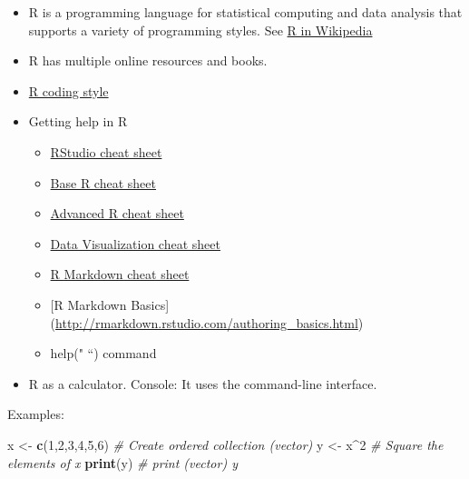 \documentclass[]{book}
\newenvironment{Shaded}{\begin{snugshade}}{\end{snugshade}}
\newcommand{\KeywordTok}[1]{\textcolor[rgb]{0.13,0.29,0.53}{\textbf{{#1}}}}
\newcommand{\DecValTok}[1]{\textcolor[rgb]{0.00,0.00,0.81}{{#1}}}
\newcommand{\StringTok}[1]{\textcolor[rgb]{0.31,0.60,0.02}{{#1}}}
\newcommand{\CommentTok}[1]{\textcolor[rgb]{0.56,0.35,0.01}{\textit{{#1}}}}
\newcommand{\NormalTok}[1]{{#1}}
\providecommand{\tightlist}{%
  \setlength{\itemsep}{0pt}\setlength{\parskip}{0pt}}
\begin{document}
\begin{itemize}
\tightlist
\item
  R is a programming language for statistical computing and data
  analysis that supports a variety of programming styles. See
  \href{https://en.wikipedia.org/wiki/R_(programming_language)}{R in
  Wikipedia}
\item
  R has multiple online resources and books.
\item
  \href{https://google.github.io/styleguide/Rguide.xml}{R coding style}
\item
  Getting help in R

  \begin{itemize}
  \tightlist
  \item
    \href{https://www.rstudio.com/wp-content/uploads/2016/01/rstudio-IDE-cheatsheet.pdf}{RStudio
    cheat sheet}
  \item
    \href{https://www.rstudio.com/wp-content/uploads/2016/10/r-cheat-sheet-3.pdf}{Base
    R cheat sheet}
  \item
    \href{https://www.rstudio.com/wp-content/uploads/2016/02/advancedR.pdf}{Advanced
    R cheat sheet}
  \item
    \href{https://www.rstudio.com/wp-content/uploads/2015/12/ggplot2-cheatsheet-2.0.pdf}{Data
    Visualization cheat sheet}
  \item
    \href{https://www.rstudio.com/wp-content/uploads/2015/02/rmarkdown-cheatsheet.pdf}{R
    Markdown cheat sheet}
  \item
    {[}R Markdown Basics{]}
    (\url{http://rmarkdown.rstudio.com/authoring_basics.html})
  \item
    help(" ``) command
  \end{itemize}
\item
  R as a calculator. Console: It uses the command-line interface.
\end{itemize}

Examples:

\begin{Shaded}
\begin{Highlighting}[]
\NormalTok{x <-}\StringTok{ }\KeywordTok{c}\NormalTok{(}\DecValTok{1}\NormalTok{,}\DecValTok{2}\NormalTok{,}\DecValTok{3}\NormalTok{,}\DecValTok{4}\NormalTok{,}\DecValTok{5}\NormalTok{,}\DecValTok{6}\NormalTok{)   }\CommentTok{# Create ordered collection (vector)}
\NormalTok{y <-}\StringTok{ }\NormalTok{x^}\DecValTok{2}              \CommentTok{# Square the elements of x}
\KeywordTok{print}\NormalTok{(y)              }\CommentTok{# print (vector) y}
\end{Highlighting}
\end{Shaded}
\end{document}
